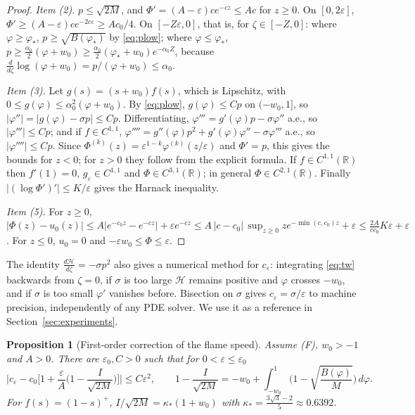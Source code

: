 \documentclass[11pt]{amsart}
\newtheorem{proposition}[theorem]{Proposition}
\theoremstyle{definition}
\theoremstyle{remark}
\newcommand{\ve}{\varepsilon}
\newcommand{\R}{\mathbb{R}}
\begin{document}
\begin{proof}
\emph{Item (2).} $p\le\sqrt{2M}$, and $\Phi'=(A-\ve)ce^{-cz}\le Ac$ for $z\ge0$. On
$[0,2\ve]$, $\Phi'\ge(A-\ve)ce^{-2c\ve}\ge Ac_0/4$. On $[-Z\ve,0]$, that is, for
$\zeta\in[-Z,0]$:
where $\varphi\ge\varphi_*$, $p\ge\sqrt{B(\varphi_*)}$ by \eqref{eq:plow}; where
$\varphi\le\varphi_*$, $p\ge\frac{\alpha_0}2(\varphi+w_0)\ge\frac{\alpha_0}2(\varphi_*+w_0)e^{-\alpha_0Z}$,
because $\frac{d}{d\zeta}\log(\varphi+w_0)=p/(\varphi+w_0)\le\alpha_0$.

\emph{Item (3).} Let $g(s)=(s+w_0)f(s)$, which is Lipschitz, with
$0\le g(\varphi)\le\alpha_0^2(\varphi+w_0)$. By \eqref{eq:plow}, $g(\varphi)\le Cp$ on
$(-w_0,1]$, so $|\varphi''|=|g(\varphi)-\sigma p|\le Cp$. Differentiating,
$\varphi'''=g'(\varphi)p-\sigma\varphi''$ a.e., so $|\varphi'''|\le Cp$; and if
$f\in C^{1,1}$, $\varphi''''=g''(\varphi)p^2+g'(\varphi)\varphi''-\sigma\varphi'''$ a.e., so
$|\varphi''''|\le Cp$. Since $\Phi^{(k)}(z)=\ve^{1-k}\varphi^{(k)}(z/\ve)$ and $\Phi'=p$, this
gives the bounds for $z<0$; for $z>0$ they follow from the explicit formula. If
$f\in C^{1,1}(\R)$ then $f'(1)=0$, $g_\ve\in C^{1,1}$ and $\Phi\in C^{3,1}(\R)$; in
general $\Phi\in C^{2,1}(\R)$. Finally $|(\log\Phi')'|\le K/\ve$ gives the Harnack
inequality.

\emph{Item (5).} For $z\ge0$,
$|\Phi(z)-u_0(z)|\le A|e^{-c_0z}-e^{-cz}|+\ve e^{-cz}\le A\,|c-c_0|\,\sup_{z\ge0}ze^{-\min(c,c_0)z}+\ve
\le\frac{2A}{ec_0}K\ve+\ve$. For $z\le0$, $u_0=0$ and $-\ve w_0\le\Phi\le\ve$.
\end{proof}

The identity $\frac{d\mathcal H}{d\zeta}=-\sigma p^2$ also gives a numerical method for $c_\ve$:
integrating \eqref{eq:tw} backwards from $\zeta=0$, if $\sigma$ is too large $\mathcal H$ remains
positive and $\varphi$ crosses $-w_0$, and if $\sigma$ is too small $\varphi'$ vanishes
before. Bisection on $\sigma$ gives $c_\ve=\sigma/\ve$ to machine precision,
independently of any PDE solver. We use it as a reference in
Section~\ref{sec:experiments}.

\begin{proposition}[First-order correction of the flame speed]\label{prop:speed}
Assume (F), $w_0>-1$ and $A>0$. There are $\ve_0,C>0$ such that for $0<\ve\le\ve_0$
\[
\Big|c_\ve-c_0\Big[1+\frac\ve A\Big(1-\frac{I}{\sqrt{2M}}\Big)\Big]\Big|\le C\ve^2 ,
\qquad
1-\frac{I}{\sqrt{2M}}=-w_0+\int_{-w_0}^1\Big(1-\sqrt{\frac{B(\varphi)}{M}}\Big)\,d\varphi .
\]
For $f(s)=(1-s)^+$, $I/\sqrt{2M}=\kappa_*(1+w_0)$ with
$\kappa_*=\frac{3\sqrt3-2}{5}\approx0.6392$.
\end{proposition}
\end{document}
